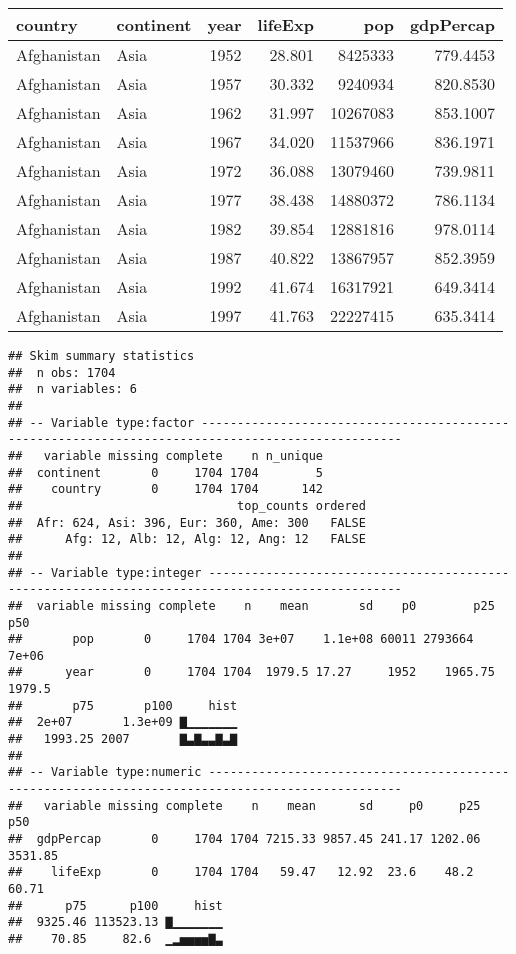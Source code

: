 \documentclass[]{article}
\begin{document}
\begin{table}[H]
\centering
\begin{tabular}{l|l|r|r|r|r}
\hline
country & continent & year & lifeExp & pop & gdpPercap\\
\hline
Afghanistan & Asia & 1952 & 28.801 & 8425333 & 779.4453\\
\hline
Afghanistan & Asia & 1957 & 30.332 & 9240934 & 820.8530\\
\hline
Afghanistan & Asia & 1962 & 31.997 & 10267083 & 853.1007\\
\hline
Afghanistan & Asia & 1967 & 34.020 & 11537966 & 836.1971\\
\hline
Afghanistan & Asia & 1972 & 36.088 & 13079460 & 739.9811\\
\hline
Afghanistan & Asia & 1977 & 38.438 & 14880372 & 786.1134\\
\hline
Afghanistan & Asia & 1982 & 39.854 & 12881816 & 978.0114\\
\hline
Afghanistan & Asia & 1987 & 40.822 & 13867957 & 852.3959\\
\hline
Afghanistan & Asia & 1992 & 41.674 & 16317921 & 649.3414\\
\hline
Afghanistan & Asia & 1997 & 41.763 & 22227415 & 635.3414\\
\hline
\end{tabular}
\end{table}

\begin{verbatim}
## Skim summary statistics
##  n obs: 1704 
##  n variables: 6 
## 
## -- Variable type:factor --------------------------------------------------------------------------------------------------
##   variable missing complete    n n_unique
##  continent       0     1704 1704        5
##    country       0     1704 1704      142
##                              top_counts ordered
##  Afr: 624, Asi: 396, Eur: 360, Ame: 300   FALSE
##      Afg: 12, Alb: 12, Alg: 12, Ang: 12   FALSE
## 
## -- Variable type:integer -------------------------------------------------------------------------------------------------
##  variable missing complete    n    mean       sd    p0        p25     p50
##       pop       0     1704 1704 3e+07    1.1e+08 60011 2793664    7e+06  
##      year       0     1704 1704  1979.5 17.27     1952    1965.75  1979.5
##       p75       p100     hist
##  2e+07       1.3e+09 ▇▁▁▁▁▁▁▁
##   1993.25 2007       ▇▃▇▃▃▇▃▇
## 
## -- Variable type:numeric -------------------------------------------------------------------------------------------------
##   variable missing complete    n    mean      sd     p0     p25     p50
##  gdpPercap       0     1704 1704 7215.33 9857.45 241.17 1202.06 3531.85
##    lifeExp       0     1704 1704   59.47   12.92  23.6    48.2    60.71
##      p75      p100     hist
##  9325.46 113523.13 ▇▁▁▁▁▁▁▁
##    70.85     82.6  ▁▂▅▅▅▅▇▃
\end{verbatim}
\end{document}
